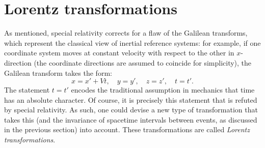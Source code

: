 \section{Lorentz transformations}
As mentioned, special relativity corrects for a flaw of the Galilean transforms, which represent the classical view of inertial reference systems: for example, if one coordinate system moves at constant velocity with respect to the other in \(x\)-direction (the coordinate directions are assumed to coincide for simplicity), the Galilean transform takes the form:
\begin{equation}
    x = x' + Vt, \quad y = y', \quad z = z',\quad t = t'.
    \label{eq:galilean_transform}
\end{equation}
The statement \(t = t'\) encodes the traditional assumption in mechanics that time has an absolute character. Of course, it is precisely this statement that is refuted by special relativity. As such, one could devise a new type of transformation that takes this (and the invariance of spacetime intervals between events, as discussed in the previous section) into account. These transformations are called \emph{Lorentz transformations}. 

